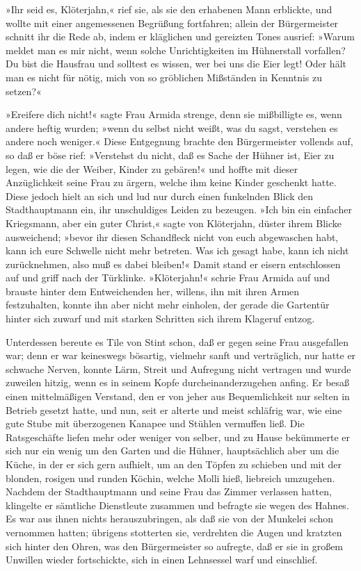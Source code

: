 »Ihr seid es, Klöterjahn,« rief sie, als sie den erhabenen Mann
erblickte, und wollte mit einer angemessenen Begrüßung fortfahren;
allein der Bürgermeister schnitt ihr die Rede ab, indem er
kläglichen und gereizten Tones ausrief: »Warum meldet man es mir
nicht, wenn solche Unrichtigkeiten im Hühnerstall vorfallen? Du
bist die Hausfrau und solltest es wissen, wer bei uns die Eier
legt! Oder hält man es nicht für nötig, mich von so gröblichen
Mißständen in Kenntnis zu setzen?«

»Ereifere dich nicht!« sagte Frau Armida strenge, denn sie
mißbilligte es, wenn andere heftig wurden; »wenn du selbst nicht
weißt, was du sagst, verstehen es andere noch weniger.« Diese
Entgegnung brachte den Bürgermeister vollends auf, so daß er böse
rief: »Verstehst du nicht, daß es Sache der Hühner ist, Eier zu
legen, wie die der Weiber, Kinder zu gebären!« und hoffte mit
dieser Anzüglichkeit seine Frau zu ärgern, welche ihm keine Kinder
geschenkt hatte. Diese jedoch hielt an sich und lud nur durch einen
funkelnden Blick den Stadthauptmann ein, ihr unschuldiges Leiden zu
bezeugen. »Ich bin ein einfacher Kriegsmann, aber ein guter
Christ,« sagte von Klöterjahn, düster ihrem Blicke ausweichend;
»bevor ihr diesen Schandfleck nicht von euch abgewaschen habt, kann
ich eure Schwelle nicht mehr betreten. Was ich gesagt habe, kann
ich nicht zurücknehmen, also muß es dabei bleiben!« Damit stand er
eisern entschlossen auf und griff nach der Türklinke. »Klöterjahn!«
schrie Frau Armida auf und brauste hinter dem Entweichenden her,
willens, ihn mit ihren Armen festzuhalten, konnte ihn aber nicht
mehr einholen, der gerade die Gartentür \pagenum{[13]} hinter sich
zuwarf und mit starken Schritten sich ihrem Klageruf entzog.

Unterdessen bereute es Tile von Stint schon, daß er gegen seine
Frau ausgefallen war; denn er war keineswegs bösartig, vielmehr
sanft und verträglich, nur hatte er schwache Nerven, konnte Lärm,
Streit und Aufregung nicht vertragen und wurde zuweilen hitzig,
wenn es in seinem Kopfe durcheinanderzugehen anfing. Er besaß einen
mittelmäßigen Verstand, den er von jeher aus Bequemlichkeit nur
selten in Betrieb gesetzt hatte, und nun, seit er alterte und meist
schläfrig war, wie eine gute Stube mit überzogenen Kanapee und
Stühlen vermuffen ließ. Die Ratsgeschäfte liefen mehr oder weniger
von selber, und zu Hause bekümmerte er sich nur ein wenig um den
Garten und die Hühner, hauptsächlich aber um die Küche, in der er
sich gern aufhielt, um an den Töpfen zu schieben und mit der
blonden, rosigen und runden Köchin, welche Molli hieß, liebreich
umzugehen. Nachdem der Stadthauptmann und seine Frau das Zimmer
verlassen hatten, klingelte er sämtliche Dienstleute zusammen und
befragte sie wegen des Hahnes. Es war aus ihnen nichts
herauszubringen, als daß sie von der Munkelei schon vernommen
hatten; übrigens stotterten sie, verdrehten die Augen und kratzten
sich hinter den Ohren, was den Bürgermeister so aufregte, daß er
sie in großem Unwillen wieder fortschickte, sich in einen
Lehnsessel warf und einschlief.

